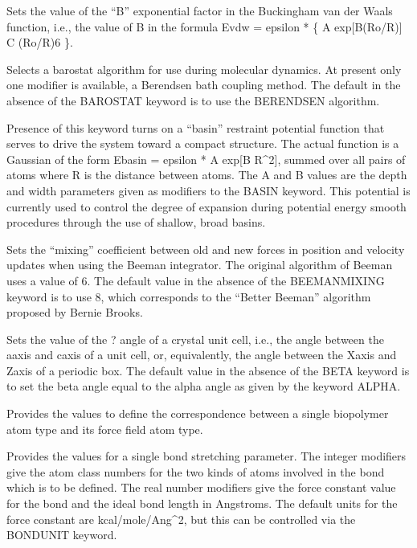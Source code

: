 \documentclass[letterpaper,11pt,english]{sphinxmanual}
\begin{document}
  Sets the value of the “B” exponential factor in the Buckingham van der Waals function, i.e., the value of B in the formula Evdw = epsilon * \{ A exp{[}\sphinxhyphen{}B(Ro/R){]} \sphinxhyphen{} C (Ro/R)6 \}.

  Selects a barostat algorithm for use during molecular dynamics. At present only one modifier is available, a Berendsen bath coupling method. The default in the absence of the BAROSTAT keyword is to use the BERENDSEN algorithm.

  Presence of this keyword turns on a “basin” restraint potential function that serves to drive the system toward a compact structure. The actual function is a Gaussian of the form Ebasin = epsilon * A exp{[}\sphinxhyphen{}B R\textasciicircum{}2{]}, summed over all pairs of atoms where R is the distance between atoms. The A and B values are the depth and width parameters given as modifiers to the BASIN keyword. This potential is currently used to control the degree of expansion during potential energy smooth procedures through the use of shallow, broad basins.


  Sets the “mixing” coefficient between old and new forces in position and velocity updates when using the Beeman integrator. The original algorithm of Beeman uses a value of 6. The default value in the absence of the BEEMAN\sphinxhyphen{}MIXING keyword is to use 8, which corresponds to the “Better Beeman” algorithm proposed by Bernie Brooks.

  Sets the value of the ? angle of a crystal unit cell, i.e., the angle between the a\sphinxhyphen{}axis and c\sphinxhyphen{}axis of a unit cell, or, equivalently, the angle between the X\sphinxhyphen{}axis and Z\sphinxhyphen{}axis of a periodic box. The default value in the absence of the BETA keyword is to set the beta angle equal to the alpha angle as given by the keyword ALPHA.

  Provides the values to define the correspondence between a single biopolymer atom type and its force field atom type.

  Provides the values for a single bond stretching parameter. The integer modifiers give the atom class numbers for the two kinds of atoms involved in the bond which is to be defined. The real number modifiers give the force constant value for the bond and the ideal bond length in Angstroms. The default units for the force constant are kcal/mole/Ang\textasciicircum{}2, but this can be controlled via the BONDUNIT keyword.
\end{document}
